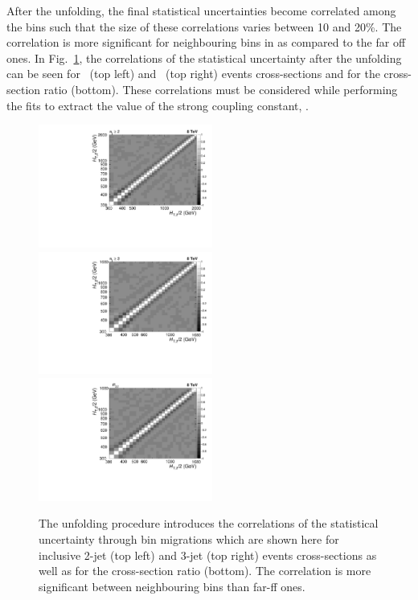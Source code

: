 After the unfolding, the final statistical uncertainties become correlated among the bins such that the size of these correlations varies between 10 and 20\%. The correlation is more significant for neighbouring bins in \httwo as compared to the far off ones. In Fig.~\ref{fig:corr}, the correlations of the statistical uncertainty after the unfolding can be seen for \njt~(top left) and \njth~(top right) events cross-sections and for the cross-section ratio \ratio (bottom). These correlations must be considered while performing the fits to extract the value of the strong coupling constant, \alpsns. 

\begin{figure}[!h]
 \begin{center}
 \hspace*{-3mm}\includegraphics[width=0.51\textwidth]{Plots_HT_2_150/Correlation_Matrix_NLO_2_ite4.pdf}%
 ~~\includegraphics[width=0.51\textwidth]{Plots_HT_2_150/Correlation_Matrix_NLO_3_ite4.pdf}\\
 \includegraphics[width=0.51\textwidth]{Plots_HT_2_150/Correlation_Matrix_NLO_Ratio_32_ite4.pdf}
 \caption[The unfolding procedure introduces the correlations of the statistical uncertainty through bin migrations.]{The unfolding procedure introduces the correlations of the statistical uncertainty through bin migrations which are shown here for inclusive 2-jet (top left) and 3-jet (top right) events cross-sections as well as for the cross-section ratio \ratio (bottom). The correlation is more significant between neighbouring bins than far-ff ones.}
 \label{fig:corr}
 \end{center}
\end{figure}
